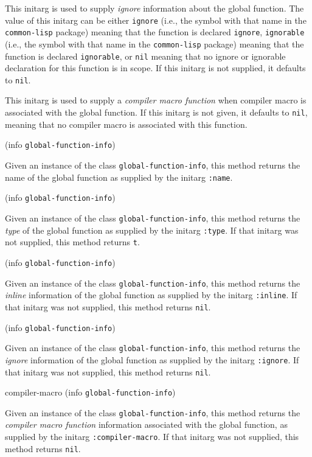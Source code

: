 
This initarg is used to supply \emph{ignore} information about the
global function.  The value of this initarg can be either
\texttt{ignore} (i.e., the symbol with that name in the
\texttt{common-lisp} package) meaning that the function is declared
\texttt{ignore}, \texttt{ignorable} (i.e., the symbol with that name
in the \texttt{common-lisp} package) meaning that the function is
declared \texttt{ignorable}, or \texttt{nil} meaning that no ignore or
ignorable declaration for this function is in scope.  If this initarg
is not supplied, it defaults to \texttt{nil}.


This initarg is used to supply a \emph{compiler macro function} when
compiler macro is associated with the global function.  If this
initarg is not given, it defaults to \texttt{nil}, meaning that no
compiler macro is associated with this function. 

 {(info {\tt global-function-info})}

Given an instance of the class \texttt{global-function-info}, this
method returns the name of the global function as supplied by the
initarg \texttt{:name}.

 {(info {\tt global-function-info})}

Given an instance of the class \texttt{global-function-info}, this
method returns the \emph{type} of the global function as supplied by the
initarg \texttt{:type}.  If that initarg was not supplied, this method
returns \texttt{t}.

 {(info {\tt global-function-info})}

Given an instance of the class \texttt{global-function-info}, this
method returns the \emph{inline} information of the global function as
supplied by the initarg \texttt{:inline}.  If that initarg was not
supplied, this method returns \texttt{nil}.

 {(info {\tt global-function-info})}

Given an instance of the class \texttt{global-function-info}, this
method returns the \emph{ignore} information of the global function as
supplied by the initarg \texttt{:ignore}.  If that initarg was not
supplied, this method returns \texttt{nil}.

\Defmethod compiler-macro {(info {\tt global-function-info})}

Given an instance of the class \texttt{global-function-info}, this
method returns the \emph{compiler macro function} information
associated with the global function, as supplied by the initarg
\texttt{:compiler-macro}.  If that initarg was not supplied, this
method returns \texttt{nil}.

